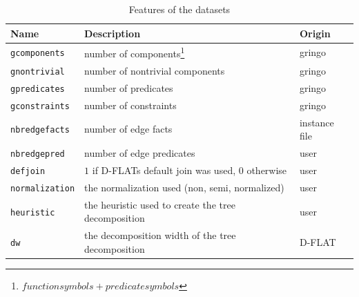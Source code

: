 \begin{table}
	\label{tbl:mlFeat}
	\center
	\begin{tabular}{|l|l|l|}
		\hline
		Name & Description & Origin \\
		\hline
		\lstinline$gcomponents$ & number of components\footnote{$function symbols+ predicate symbols$} & gringo\\
		\lstinline$gnontrivial$ & number of nontrivial components & gringo\\
		\lstinline$gpredicates$ & number of predicates & gringo \\
		\lstinline$gconstraints$ & number of constraints & gringo\\
		\lstinline$nbredgefacts$ & number of edge facts & instance file\\
		\lstinline$nbredgepred$ & number of edge predicates & user \\
		\lstinline$defjoin$ & $1$ if D-FLATs default join was used, $0$ otherwise & user\\
		\lstinline$normalization$ & the normalization used (non, semi, normalized) & user\\
		\lstinline$heuristic$ & the heuristic used to create the tree decomposition & user\\
		\lstinline$dw$ & the decomposition width of the tree decomposition & D-FLAT\\
		\hline
	\end{tabular}
	\caption{Features of the datasets}
\end{table}

